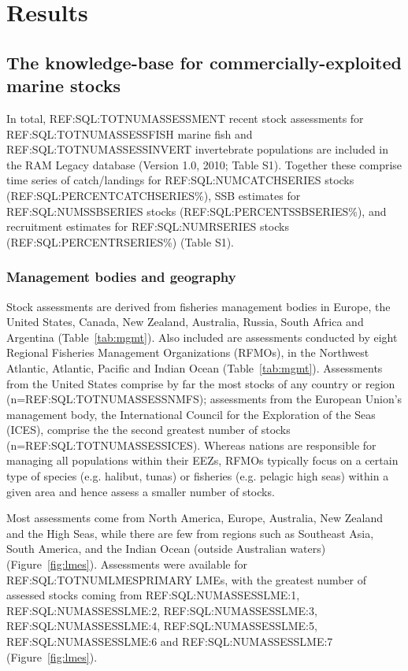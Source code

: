 \newpage
\section*{Results}
\subsection*{The knowledge-base for commercially-exploited marine stocks}
In total, REF:SQL:TOTNUMASSESSMENT recent stock assessments for
REF:SQL:TOTNUMASSESSFISH marine fish and REF:SQL:TOTNUMASSESSINVERT
invertebrate populations are included in the RAM Legacy database
(Version 1.0, 2010; Table S1). Together these comprise time series of
catch/landings for REF:SQL:NUMCATCHSERIES stocks (REF:SQL:PERCENTCATCHSERIES\%),
SSB estimates for REF:SQL:NUMSSBSERIES stocks (REF:SQL:PERCENTSSBSERIES\%), and recruitment estimates for
REF:SQL:NUMRSERIES stocks (REF:SQL:PERCENTRSERIES\%) (Table S1).

\subsubsection*{Management bodies and geography}
Stock assessments are derived from fisheries management bodies in
Europe, the United States, Canada, New Zealand, Australia, Russia,
South Africa and Argentina (Table~\ref{tab:mgmt}). Also included are
assessments conducted by eight Regional Fisheries Management
Organizations (RFMOs), in the Northwest Atlantic, Atlantic, Pacific
and Indian Ocean (Table~\ref{tab:mgmt}). Assessments from the United
States comprise by far the most stocks of any country or region
(n=REF:SQL:TOTNUMASSESSNMFS); assessments from the European Union's
management body, the International Council for the Exploration of the
Seas (ICES), comprise the the second greatest number of stocks
(n=REF:SQL:TOTNUMASSESSICES).  Whereas nations are responsible for
managing all populations within their EEZs, RFMOs typically focus on a
certain type of species (e.g.  halibut, tunas) or fisheries (e.g.
pelagic high seas) within a given area and hence assess a smaller
number of stocks.

Most assessments come from North America, Europe, Australia, New
Zealand and the High Seas, while there are few from regions such as
Southeast Asia, South America, and the Indian Ocean (outside
Australian waters) (Figure~\ref{fig:lmes}). Assessments were available for REF:SQL:TOTNUMLMESPRIMARY LMEs, with the greatest number of
assessed stocks coming from REF:SQL:NUMASSESSLME:1,
REF:SQL:NUMASSESSLME:2, REF:SQL:NUMASSESSLME:3,
REF:SQL:NUMASSESSLME:4, REF:SQL:NUMASSESSLME:5, REF:SQL:NUMASSESSLME:6
and REF:SQL:NUMASSESSLME:7 (Figure~\ref{fig:lmes}).

